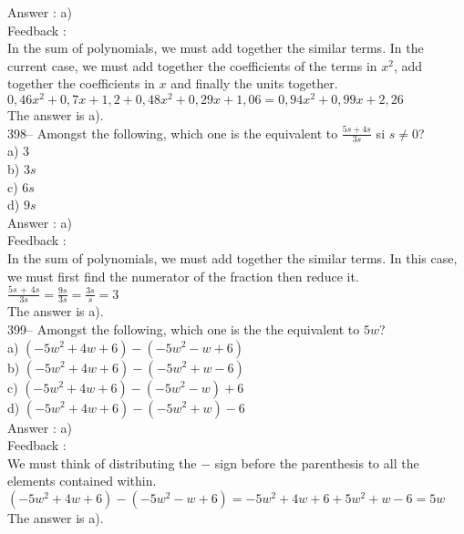 ﻿\documentclass[letterpaper, 12pt]{article}
\begin{document}
Answer : a) \\

Feedback : \\
In the sum of polynomials, we must add together the similar terms. In the current case, we must add together the coefficients of the terms in $x^{2}$, add together the coefficients in $x$ and finally the units together.\\
$0,46x^{2}+0,7x+1,2+0,48x^{2}+0,29x+1,06=0,94x^{2}+0,99x+2,26$\\
The answer is a).\\

398-- Amongst the following, which one is the equivalent to
$\frac{5s+4s}{3s}$ si $s\neq0$?\\
a) 3\\
b) $3s$\\
c) $6s$\\
d) $9s$\\

Answer : a)\\

Feedback : \\
In the sum of polynomials, we must add together the similar terms. In this case, we must first find the numerator of the fraction then reduce it.\\[2mm]
$\frac{5s\,+\,4s}{3s}=\frac{9s}{3s}=\frac{3s}{s}=3$\\[2mm]
The answer is a).\\

399-- Amongst the following, which one is the the equivalent to $5w$?\\
a) $\left( -5w^{2}+4w+6\right) -\left( -5w^{2}-w+6\right) $\\
b) $\left( -5w^{2}+4w+6\right) -\left( -5w^{2}+w-6\right) $\\
c) $\left( -5w^{2}+4w+6\right) -\left( -5w^{2}-w\right) +6 $\\
d) $\left( -5w^{2}+4w+6\right) -\left( -5w^{2}+w\right) -6$\\

Answer : a)\\

Feedback : \\
We must think of distributing the $-$ sign before the parenthesis to all the elements contained within.\\
$\left( -5w^{2}+4w+6\right) -\left(
-5w^{2}-w+6\right)=-5w^{2}+4w+6+5w^{2}+w-6=5w $\\
The answer is a).\\
\end{document}
